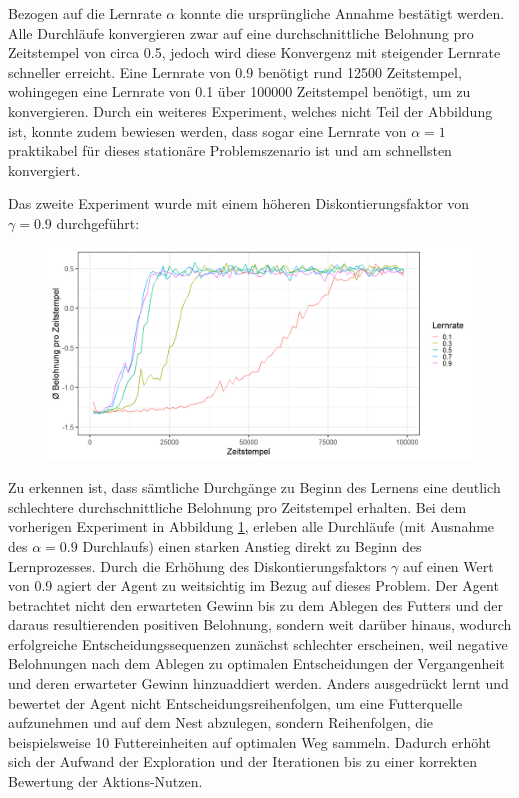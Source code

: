 Bezogen auf die Lernrate $\alpha$ konnte die ursprüngliche Annahme bestätigt werden. Alle Durchläufe konvergieren zwar auf eine durchschnittliche Belohnung pro Zeitstempel von circa 0.5, jedoch wird diese Konvergenz mit steigender Lernrate schneller erreicht. Eine Lernrate von 0.9 benötigt rund 12500 Zeitstempel, wohingegen eine Lernrate von 0.1 über 100000 Zeitstempel benötigt, um zu konvergieren. Durch ein weiteres Experiment, welches nicht Teil der Abbildung ist, konnte zudem bewiesen werden, dass sogar eine Lernrate von $\alpha = 1$ praktikabel für dieses stationäre Problemszenario ist und am schnellsten konvergiert.
\par 
Das zweite Experiment wurde mit einem höheren Diskontierungsfaktor von $\gamma=0.9$ durchgeführt:
\begin{figure}[H]
    \centering
    \includegraphics[width=\textwidth]{images/antGameAnalysis09DiscA}
    \label{fig:gamma09}
\end{figure}
Zu erkennen ist, dass sämtliche Durchgänge zu Beginn des Lernens eine deutlich schlechtere durchschnittliche Belohnung pro Zeitstempel erhalten. Bei dem vorherigen Experiment in Abbildung \ref{fig:gamma09}, erleben alle Durchläufe (mit Ausnahme des $\alpha = 0.9$ Durchlaufs) einen starken Anstieg direkt zu Beginn des Lernprozesses. Durch die Erhöhung des Diskontierungsfaktors $\gamma$ auf einen Wert von 0.9 agiert der Agent zu weitsichtig im Bezug auf dieses Problem. Der Agent betrachtet nicht den erwarteten Gewinn bis zu dem Ablegen des Futters und der daraus resultierenden positiven Belohnung, sondern weit darüber hinaus, wodurch erfolgreiche Entscheidungssequenzen zunächst schlechter erscheinen, weil negative Belohnungen nach dem Ablegen zu optimalen Entscheidungen der Vergangenheit und deren erwarteter Gewinn hinzuaddiert werden. Anders ausgedrückt lernt und bewertet der Agent nicht Entscheidungsreihenfolgen, um eine Futterquelle aufzunehmen und auf dem Nest abzulegen, sondern Reihenfolgen, die beispielsweise 10 Futtereinheiten auf optimalen Weg sammeln. Dadurch erhöht sich der Aufwand der Exploration und der Iterationen bis zu einer korrekten Bewertung der Aktions-Nutzen.
